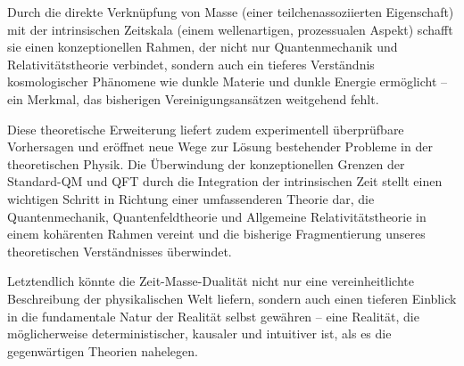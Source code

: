 \documentclass[12pt,a4paper]{article}  %
\begin{document}
		Durch die direkte Verknüpfung von Masse (einer teilchenassoziierten Eigenschaft) mit der intrinsischen Zeitskala (einem wellenartigen, prozessualen Aspekt) schafft sie einen konzeptionellen Rahmen, der nicht nur Quantenmechanik und Relativitätstheorie verbindet, sondern auch ein tieferes Verständnis kosmologischer Phänomene wie dunkle Materie und dunkle Energie ermöglicht – ein Merkmal, das bisherigen Vereinigungsansätzen weitgehend fehlt.
		
		Diese theoretische Erweiterung liefert zudem experimentell überprüfbare Vorhersagen und eröffnet neue Wege zur Lösung bestehender Probleme in der theoretischen Physik. Die Überwindung der konzeptionellen Grenzen der Standard-QM und QFT durch die Integration der intrinsischen Zeit stellt einen wichtigen Schritt in Richtung einer umfassenderen Theorie dar, die Quantenmechanik, Quantenfeldtheorie und Allgemeine Relativitätstheorie in einem kohärenten Rahmen vereint und die bisherige Fragmentierung unseres theoretischen Verständnisses überwindet.
		
		Letztendlich könnte die Zeit-Masse-Dualität nicht nur eine vereinheitlichte Beschreibung der physikalischen Welt liefern, sondern auch einen tieferen Einblick in die fundamentale Natur der Realität selbst gewähren – eine Realität, die möglicherweise deterministischer, kausaler und intuitiver ist, als es die gegenwärtigen Theorien nahelegen.
		
\end{document}
